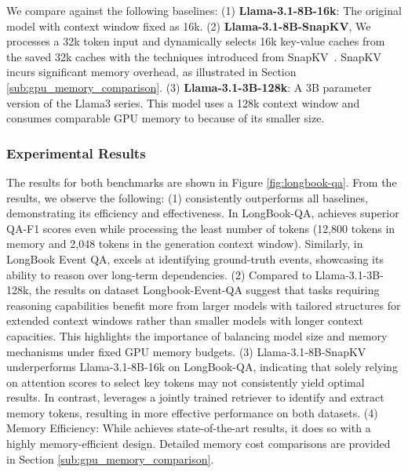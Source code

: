 We compare \ours against the following baselines: (1) \textbf{Llama-3.1-8B-16k}: The original model with context window fixed as 16k. (2) \textbf{Llama-3.1-8B-SnapKV}, We processes a 32k token input and dynamically selects 16k key-value caches from the saved 32k caches with the techniques introduced from SnapKV~\citep{snapkv}. SnapKV incurs significant memory overhead, as illustrated in Section \ref{sub:gpu_memory_comparison}. (3) \textbf{Llama-3.1-3B-128k}: A 3B parameter version of the Llama3 series. This model uses a 128k context window and consumes comparable GPU memory to \ours because of its smaller size.

\subsubsection{Experimental Results}
The results for both benchmarks are shown in Figure \ref{fig:longbook-qa}. From the results, we observe the following: (1) \ours consistently outperforms all baselines, demonstrating its efficiency and effectiveness. In LongBook-QA, \ours achieves superior QA-F1 scores even while processing the least number of tokens (12,800 tokens in memory and 2,048 tokens in the generation context window). Similarly, in LongBook Event QA, \ours excels at identifying ground-truth events, showcasing its ability to reason over long-term dependencies. (2) Compared to Llama-3.1-3B-128k, the results on dataset Longbook-Event-QA suggest that tasks requiring reasoning capabilities benefit more from larger models with tailored structures for extended context windows rather than smaller models with longer context capacities. This highlights the importance of balancing model size and memory mechanisms under fixed GPU memory budgets. (3) Llama-3.1-8B-SnapKV underperforms Llama-3.1-8B-16k on LongBook-QA, indicating that solely relying on attention scores to select key tokens may not consistently yield optimal results. In contrast, \ours leverages a jointly trained retriever to identify and extract memory tokens, resulting in more effective performance on both datasets. (4)
Memory Efficiency: While \ours achieves state-of-the-art results, it does so with a highly memory-efficient design. Detailed memory cost comparisons are provided in Section \ref{sub:gpu_memory_comparison}. 


